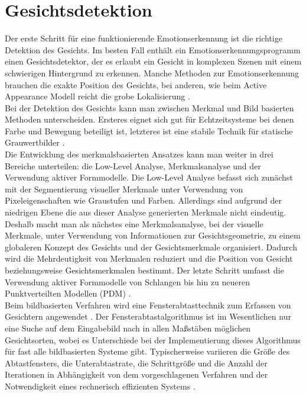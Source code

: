 \documentclass[12pt,a4paper,headinclude,twoside, plainheadsepline, open=right,numbers=noenddot]{scrreprt}
\begin{document}
\section{Gesichtsdetektion}
Der erste Schritt für eine funktionierende Emotionserkennung ist die richtige Detektion des Gesichts. Im besten Fall enthält ein Emotionserkennungsprogramm einen Gesichtsdetektor, der es erlaubt ein Gesicht in komplexen Szenen mit einem schwierigen Hintergrund zu erkennen. Manche Methoden zur Emotionserkennung brauchen die exakte Position des Gesichts, bei anderen, wie beim Active Appearance Modell reicht die grobe Lokalisierung \cite{Fasel2002AutomaticFacialExpressionsAnalysis}.\\
Bei der Detektion des Gesichts kann man zwischen Merkmal und Bild basierten Methoden unterscheiden. Ersteres eignet sich gut für Echtzeitsysteme bei denen Farbe und Bewegung beteiligt ist, letzteres ist eine stabile Technik für statische Grauwertbilder \cite{Hjelmas2001FaceDetection}. \\
Die Entwicklung des merkmalsbasierten Ansatzes kann man weiter in drei Bereiche unterteilen: die Low-Level Analyse, Merkmalsanalyse und der Verwendung aktiver Formmodelle. Die Low-Level Analyse befasst sich zunächst mit der Segmentierung visueller Merkmale unter Verwendung von Pixeleigenschaften wie Graustufen und Farben. Allerdings sind aufgrund der niedrigen Ebene die aus dieser Analyse generierten Merkmale nicht eindeutig. Deshalb macht man als nächstes eine Merkmalsanalyse, bei der visuelle Merkmale, unter Verwendung von Informationen zur Gesichtsgeometrie, zu einem globaleren Konzept des Gesichts und der Gesichtsmerkmale organisiert. Dadurch wird die Mehrdeutigkeit von Merkmalen reduziert und die Position von Gesicht beziehungsweise Gesichtsmerkmalen bestimmt. Der letzte Schritt umfasst die Verwendung aktiver Formmodelle von Schlangen bis hin zu neueren Punktverteilten Modellen (PDM) \cite{Hjelmas2001FaceDetection}.\\
Beim bildbasierten Verfahren wird eine Fensterabtasttechnik zum Erfassen von Gesichtern angewendet \cite{Hjelmas2001FaceDetection}. Der Fensterabtastalgorithmus ist im Wesentlichen nur eine Suche auf dem Eingabebild nach in allen Maßstäben möglichen Gesichtsorten, wobei es Unterschiede bei der Implementierung dieses Algorithmus für fast alle bildbasierten Systeme gibt. Typischerweise variieren die Größe des Abtastfensters, die Unterabtastrate, die Schrittgröße und die Anzahl der Iterationen in Abhängigkeit von dem vorgeschlagenen Verfahren und der Notwendigkeit eines rechnerisch effizienten Systems \cite{Hjelmas2001FaceDetection}.
\end{document}

